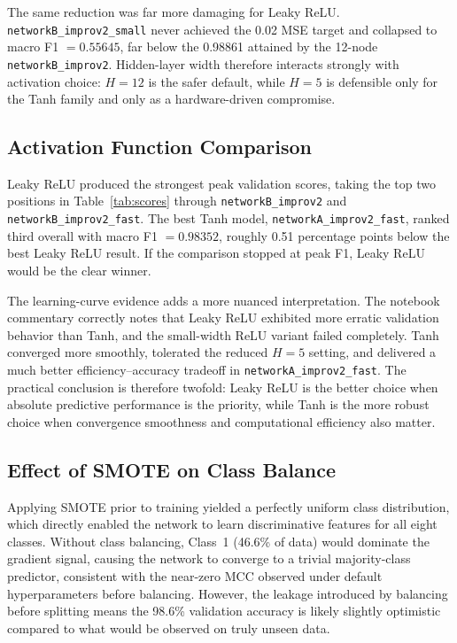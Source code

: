 \documentclass{acm_proc_article-sp}
\begin{document}
The same reduction was far more damaging for Leaky ReLU.
\texttt{networkB\_improv2\_small} never achieved the 0.02 MSE target and
collapsed to macro F1 $=0.55645$, far below the 0.98861 attained by the
12-node \texttt{networkB\_improv2}.  Hidden-layer width therefore
interacts strongly with activation choice: $H=12$ is the safer default,
while $H=5$ is defensible only for the Tanh family and only as a
hardware-driven compromise.

\subsection{Activation Function Comparison}

\begin{sloppypar}
Leaky ReLU produced the strongest peak validation scores, taking the top
two positions in Table~\ref{tab:scores} through
\texttt{networkB\_improv2} and \texttt{networkB\_improv2\_fast}. The
best Tanh model, \texttt{networkA\_improv2\_fast}, ranked third overall
with macro F1 $=0.98352$, roughly 0.51 percentage points below the best
Leaky ReLU result. If the comparison stopped at peak F1, Leaky ReLU
would be the clear winner.
\end{sloppypar}

The learning-curve evidence adds a more nuanced interpretation.  The
notebook commentary correctly notes that Leaky ReLU exhibited more
erratic validation behavior than Tanh, and the small-width ReLU variant
failed completely.  Tanh converged more smoothly, tolerated the reduced
$H=5$ setting, and delivered a much better efficiency--accuracy tradeoff
in \texttt{networkA\_improv2\_fast}.  The practical conclusion is
therefore twofold: Leaky ReLU is the better choice when absolute
predictive performance is the priority, while Tanh is the more robust
choice when convergence smoothness and computational efficiency also
matter.

\subsection{Effect of SMOTE on Class Balance}

Applying SMOTE prior to training yielded a perfectly uniform class
distribution, which directly enabled the network to learn discriminative
features for all eight classes.  Without class balancing, Class~1
(46.6\% of data) would dominate the gradient signal, causing the network
to converge to a trivial majority-class predictor, consistent with
the near-zero MCC observed under default hyperparameters before
balancing.  However, the leakage introduced by balancing before
splitting means the 98.6\% validation accuracy is likely slightly
optimistic compared to what would be observed on truly unseen data.
\end{document}
